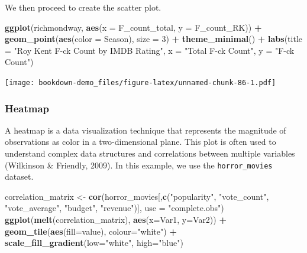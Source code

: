 \documentclass[
  b5paper]{book}
\newenvironment{Shaded}{\begin{snugshade}}{\end{snugshade}}
\newcommand{\AttributeTok}[1]{\textcolor[rgb]{0.13,0.29,0.53}{#1}}
\newcommand{\DecValTok}[1]{\textcolor[rgb]{0.00,0.00,0.81}{#1}}
\newcommand{\FunctionTok}[1]{\textcolor[rgb]{0.13,0.29,0.53}{\textbf{#1}}}
\newcommand{\NormalTok}[1]{#1}
\newcommand{\OtherTok}[1]{\textcolor[rgb]{0.56,0.35,0.01}{#1}}
\newcommand{\SpecialCharTok}[1]{\textcolor[rgb]{0.81,0.36,0.00}{\textbf{#1}}}
\newcommand{\StringTok}[1]{\textcolor[rgb]{0.31,0.60,0.02}{#1}}
\begin{document}
We then proceed to create the scatter plot.

\begin{Shaded}
\begin{Highlighting}[]
\FunctionTok{ggplot}\NormalTok{(richmondway, }\FunctionTok{aes}\NormalTok{(}\AttributeTok{x =}\NormalTok{ F\_count\_total, }\AttributeTok{y =}\NormalTok{ F\_count\_RK)) }\SpecialCharTok{+}
  \FunctionTok{geom\_point}\NormalTok{(}\FunctionTok{aes}\NormalTok{(}\AttributeTok{color =}\NormalTok{ Season), }\AttributeTok{size =} \DecValTok{3}\NormalTok{) }\SpecialCharTok{+}
  \FunctionTok{theme\_minimal}\NormalTok{() }\SpecialCharTok{+} 
  \FunctionTok{labs}\NormalTok{(}\AttributeTok{title =} \StringTok{"Roy Kent F{-}ck Count by IMDB Rating"}\NormalTok{,}
       \AttributeTok{x =} \StringTok{"Total F{-}ck Count"}\NormalTok{,}
       \AttributeTok{y =} \StringTok{"F{-}ck Count"}\NormalTok{)}
\end{Highlighting}
\end{Shaded}

\texttt{[image: bookdown-demo\_files/figure-latex/unnamed-chunk-86-1.pdf]}

\hypertarget{heatmap}{%
\subsubsection*{Heatmap}\label{heatmap}}

A heatmap is a data visualization technique that represents the magnitude of observations as color in a two-dimensional plane. This plot is often used to understand complex data structures and correlations between multiple variables (Wilkinson \& Friendly, 2009). In this example, we use the \texttt{horror\_movies} dataset.

\begin{Shaded}
\begin{Highlighting}[]
\NormalTok{correlation\_matrix }\OtherTok{\textless{}{-}} \FunctionTok{cor}\NormalTok{(horror\_movies[,}\FunctionTok{c}\NormalTok{(}\StringTok{"popularity"}\NormalTok{, }\StringTok{"vote\_count"}\NormalTok{, }\StringTok{"vote\_average"}\NormalTok{, }\StringTok{"budget"}\NormalTok{, }\StringTok{"revenue"}\NormalTok{)], }\AttributeTok{use =} \StringTok{"complete.obs"}\NormalTok{)}
\FunctionTok{ggplot}\NormalTok{(}\FunctionTok{melt}\NormalTok{(correlation\_matrix), }\FunctionTok{aes}\NormalTok{(}\AttributeTok{x=}\NormalTok{Var1, }\AttributeTok{y=}\NormalTok{Var2)) }\SpecialCharTok{+}
  \FunctionTok{geom\_tile}\NormalTok{(}\FunctionTok{aes}\NormalTok{(}\AttributeTok{fill=}\NormalTok{value), }\AttributeTok{colour=}\StringTok{"white"}\NormalTok{) }\SpecialCharTok{+}
  \FunctionTok{scale\_fill\_gradient}\NormalTok{(}\AttributeTok{low=}\StringTok{"white"}\NormalTok{, }\AttributeTok{high=}\StringTok{"blue"}\NormalTok{)}
\end{Highlighting}
\end{Shaded}
\end{document}
